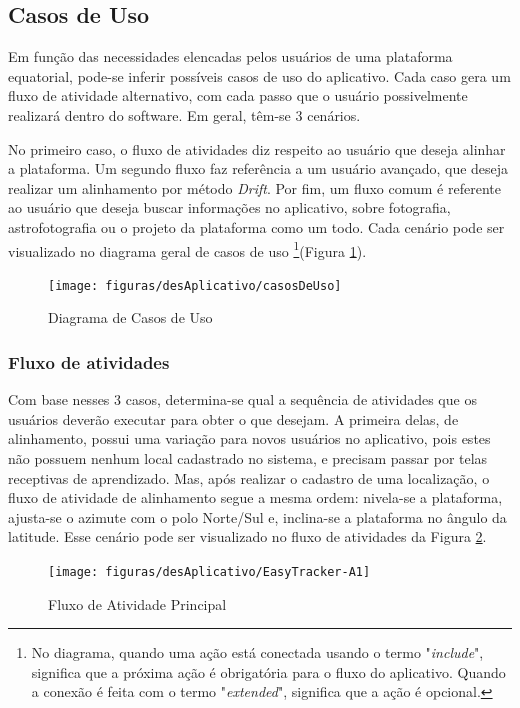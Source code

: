 \subsection{Casos de Uso}
Em função das necessidades elencadas pelos usuários de uma plataforma equatorial, pode-se inferir possíveis casos de uso do aplicativo. Cada caso gera um fluxo de atividade alternativo, com cada passo que o usuário possivelmente realizará dentro do software. Em geral, têm-se 3 cenários.

No primeiro caso, o fluxo de atividades diz respeito ao usuário que deseja alinhar a plataforma. Um segundo fluxo faz referência a um usuário avançado, que deseja realizar um alinhamento por método \textit{Drift}. Por fim, um fluxo comum é referente ao usuário que deseja buscar informações no aplicativo, sobre fotografia, astrofotografia ou o projeto da plataforma como um todo. Cada cenário pode ser visualizado no diagrama geral de casos de uso \footnote{No diagrama, quando uma ação está conectada usando o termo "\textit{include}", significa que a próxima ação é obrigatória para o fluxo do aplicativo. Quando a conexão é feita com o termo "\textit{extended}", significa que a ação é opcional.}(Figura \ref{fig:casosDeUso}).

\begin{figure}[!htb]
	\centering
	\caption{Diagrama de Casos de Uso}
	\texttt{[image: figuras/desAplicativo/casosDeUso]}
	\label{fig:casosDeUso}
\end{figure}

\subsubsection{Fluxo de atividades}

Com base nesses 3 casos, determina-se qual a sequência de atividades que os usuários deverão executar para obter o que desejam. A primeira delas, de alinhamento, possui uma variação para novos usuários no aplicativo, pois estes não possuem nenhum local cadastrado no sistema, e precisam passar por telas receptivas de aprendizado. Mas, após realizar o cadastro de uma localização, o fluxo de atividade de alinhamento segue a mesma ordem: nivela-se a plataforma, ajusta-se o azimute com o polo Norte/Sul e, inclina-se a plataforma no ângulo da latitude. Esse cenário pode ser visualizado no fluxo de atividades da Figura \ref{fig:atividadeprincipal}.

\begin{figure}[!htb]
	\centering
	\caption{Fluxo de Atividade Principal}
	\texttt{[image: figuras/desAplicativo/EasyTracker-A1]}
	\label{fig:atividadeprincipal}
\end{figure}

